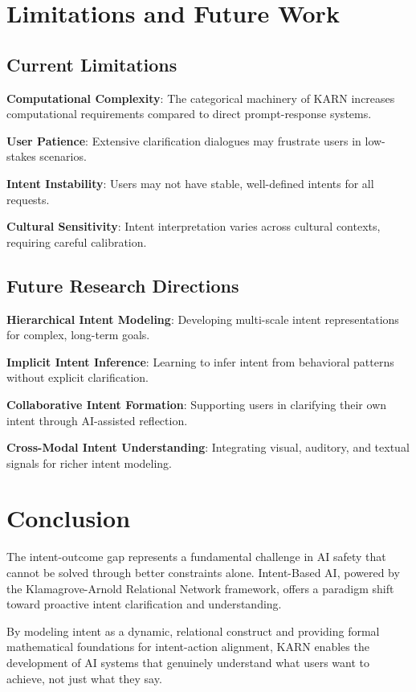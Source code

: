 \documentclass[12pt]{article}
\begin{document}
\section{Limitations and Future Work}

\subsection{Current Limitations}

\textbf{Computational Complexity}: The categorical machinery of KARN increases computational requirements compared to direct prompt-response systems.

\textbf{User Patience}: Extensive clarification dialogues may frustrate users in low-stakes scenarios.

\textbf{Intent Instability}: Users may not have stable, well-defined intents for all requests.

\textbf{Cultural Sensitivity}: Intent interpretation varies across cultural contexts, requiring careful calibration.

\subsection{Future Research Directions}

\textbf{Hierarchical Intent Modeling}: Developing multi-scale intent representations for complex, long-term goals.

\textbf{Implicit Intent Inference}: Learning to infer intent from behavioral patterns without explicit clarification.

\textbf{Collaborative Intent Formation}: Supporting users in clarifying their own intent through AI-assisted reflection.

\textbf{Cross-Modal Intent Understanding}: Integrating visual, auditory, and textual signals for richer intent modeling.

\section{Conclusion}

The intent-outcome gap represents a fundamental challenge in AI safety that cannot be solved through better constraints alone. Intent-Based AI, powered by the Klamagrove-Arnold Relational Network framework, offers a paradigm shift toward proactive intent clarification and understanding.

By modeling intent as a dynamic, relational construct and providing formal mathematical foundations for intent-action alignment, KARN enables the development of AI systems that genuinely understand what users want to achieve, not just what they say.
\end{document}
